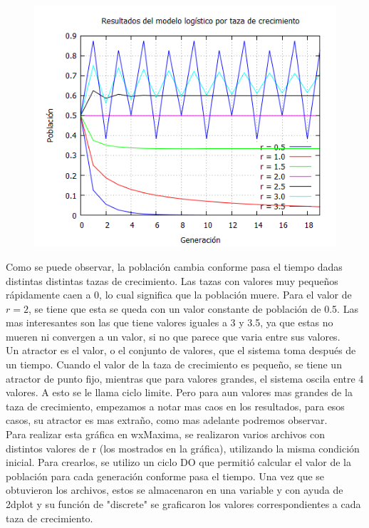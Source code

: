 \documentclass[12pt]{article}
\begin{document}
\begin{figure}[h!]
    \centering
\includegraphics[width=4.5in]{DTaza.png}
\end{figure}

Como se puede observar, la población cambia conforme pasa el tiempo dadas distintas distintas tazas de crecimiento. Las tazas con valores muy pequeños rápidamente caen a 0, lo cual significa que la población muere. Para el valor de $r=2$, se tiene que esta se queda con un valor constante de población de 0.5. Las mas interesantes son las que tiene valores iguales a 3 y 3.5, ya que estas no mueren ni convergen a un valor, si no que parece que varia entre sus valores. \\

Un atractor es el valor, o el conjunto de valores, que el sistema toma después de un tiempo. Cuando el valor de la taza de crecimiento es pequeño, se tiene un atractor de punto fijo, mientras que para valores grandes, el sistema oscila entre 4 valores. A esto se le llama ciclo limite. Pero para aun valores mas grandes de la taza de crecimiento, empezamos a notar mas caos en los resultados, para esos casos, su atractor es mas extraño, como mas adelante podremos observar. \\

Para realizar esta gráfica en wxMaxima, se realizaron varios archivos con distintos valores de r (los mostrados en la gráfica), utilizando la misma condición inicial. Para crearlos, se utilizo un ciclo DO que permitió calcular el valor de la población para cada generación conforme pasa el tiempo. Una vez que se obtuvieron los archivos, estos se almacenaron en una variable y con ayuda de 2dplot y su función de "discrete" se graficaron los valores correspondientes a cada taza de crecimiento.
\end{document}
